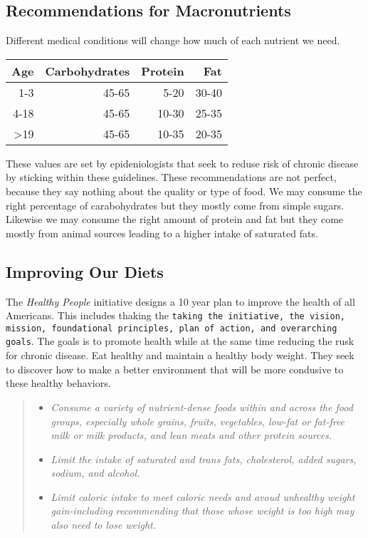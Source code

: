 \documentclass[letterpaper, 11pt]{article}
\begin{document}
\subsection{Recommendations for Macronutrients}
\label{sec:org6ecd201}
Different medical conditions will change how much of each nutrient we need.\\
\begin{center}
\begin{tabular}{rrrr}
Age & Carbohydrates & Protein & Fat\\
\hline
1-3 & 45-65 & 5-20 & 30-40\\
4-18 & 45-65 & 10-30 & 25-35\\
>19 & 45-65 & 10-35 & 20-35\\
\end{tabular}
\end{center}
These values are set by epideniologists that seek to reduse risk of chronic disease by sticking within these guidelines. These recommendations are not perfect, because they say nothing about the quality or type of food. We may consume the right percentage of carabohydrates but they mostly come from simple sugars. Likewise we may consume the right amount of protein and fat but they come mostly from animal sources leading to a higher intake of saturated fats.\\
\subsection{Improving Our Diets}
\label{sec:org1938984}
The \emph{Healthy People} initiative designs a 10 year plan to improve the health of all Americans. This includes thaking the \texttt{taking the initiative, the vision, mission, foundational principles, plan of action, and overarching goals}. The goals is to promote health while at the same time reducing the rusk for chronic disease. Eat healthy and maintain a healthy body weight. They seek to discover how to make a better environment that will be more condusive to these healthy behaviors.\\
\begin{quote}
\begin{itemize}
\item \emph{Consume a variety of nutrient-dense foods within and across the food groups, especially whole grains, fruits, vegetables, low-fat or fat-free milk or milk products, and lean meats and other protein sources.}\\
\item \emph{Limit the intake of saturated and trans fats, cholesterol, added sugars, sodium, and alcohol.}\\
\item \emph{Limit caloric intake to meet caloric needs and avoud unhealthy weight gain-including recommending that those whose weight is too high may also need to lose weight.}\\
\end{itemize}
\end{quote}
\end{document}
